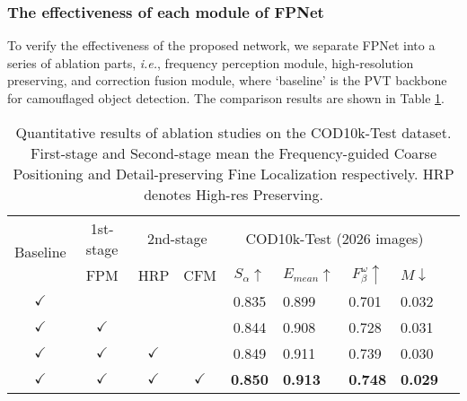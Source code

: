 \documentclass[sigconf,screen]{acmart}
\begin{document}
\subsubsection{\textbf{The effectiveness of each module of FPNet}}

To verify the effectiveness of the proposed network, we separate FPNet into a series of ablation parts, \textit{i.e.},  frequency perception module, high-resolution preserving, and correction fusion module, where `baseline' is the PVT backbone for camouflaged object detection. 
The comparison results are shown in Table \ref{tab:ablation}.

\begin{table}[t]
\caption{Quantitative results of ablation studies on the COD10k-Test dataset. First-stage and Second-stage mean the Frequency-guided Coarse Positioning and Detail-preserving Fine Localization respectively. HRP denotes High-res Preserving.}
\footnotesize{
\begin{tabular}{c|c | c | c | c llll}
\hline
\multirow{2}{*}{Baseline} &
\multicolumn{1}{c|}{1st-stage} & \multicolumn{2}{c|}{2nd-stage}  & \multicolumn{4}{c}{COD10k-Test (2026 images)}     \\ \cline{2-8}  
  & FPM & HRP & CFM & \multicolumn{1}{c}{\(S_\alpha\uparrow\) } & \multicolumn{1}{c}{ \(E_{mean} \uparrow\)} & \multicolumn{1}{c}{\(F_\beta^\omega \uparrow\)  } & \(M\downarrow\)       \\ \hline
    $\checkmark$ &  & & & 0.835                 & 0.899                  & 0.701                 & 0.032 \\
        $\checkmark$ & $\checkmark$ & & & 0.844                  & 0.908                 & 0.728                  & 0.031 \\
        $\checkmark$ & $\checkmark$ &$\checkmark$ & & 0.849                  & 0.911                  & 0.739                  & 0.030 \\
       $\checkmark$ & $\checkmark$ &$\checkmark$ & $\checkmark$ &\textbf{0.850 }                 & \textbf{0.913 }                 & \textbf{0.748}                  & \textbf{0.029} \\
\hline
\end{tabular}
}
\label{tab:ablation}
\end{table}
\end{document}
